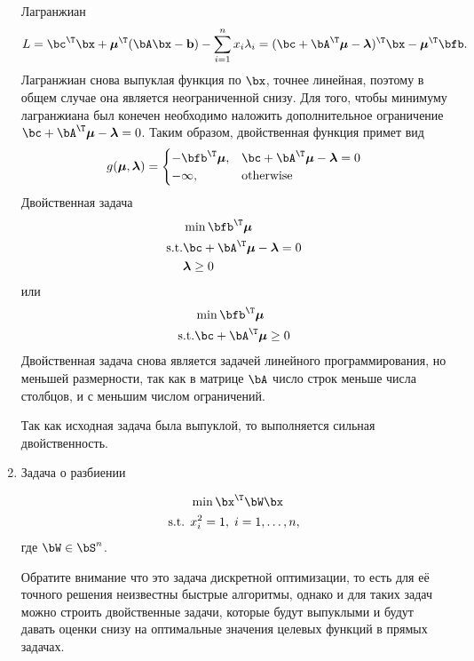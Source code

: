 \documentclass[12pt]{article}
\newcommand{\bmu}{\boldsymbol{\mu}}
\newcommand{\blambda}{\boldsymbol{\lambda}}
\begin{document}
\begin{enumerate}
Лагранжиан 
\[
L = \bc^{\T}\bx + \bmu^{\T}(\bA\bx - \mathbf{b}) - \sum_{i=1}^n x_i\lambda_i = (\bc + \bA^{\T}\bmu - \blambda)^{\T}\bx - \bmu^{\T}\bfb.
\]
Лагранжиан снова выпуклая функция по $\bx$, точнее линейная, поэтому в общем случае она является неограниченной снизу.
Для того, чтобы минимуму лагранжиана был конечен необходимо наложить дополнительное ограничение $\bc + \bA^{\T}\bmu - \blambda = 0$.
Таким образом, двойственная функция примет вид
\[
g(\bmu, \blambda) = 
\begin{cases}
-\bfb^{\T}\bmu, & \bc + \bA^{\T}\bmu - \blambda = 0 \\
-\infty, & \text{otherwise}
\end{cases}
\]
Двойственная задача
\begin{equation*}
\begin{split}
& \min \bfb^{\T}\bmu\\
\mathrm{s.t.} & \bc + \bA^{\T}\bmu - \blambda = 0 \\
& \blambda \geq 0
\end{split}
\end{equation*}
или
\begin{equation*}
\begin{split}
& \min \bfb^{\T}\bmu\\
\mathrm{s.t.} & \bc + \bA^{\T}\bmu \geq 0 \\
\end{split}
\end{equation*}
Двойственная задача снова является задачей линейного программирования, но меньшей размерности, так как в матрице $\bA$ число строк меньше числа столбцов, и с меньшим числом ограничений.

Так как исходная задача была выпуклой, то выполняется сильная двойственность. 

\item Задача о разбиении

\begin{equation*}
\begin{split}
& \min \bx^{\T}\bW\bx\\
\text{s.t. } & x^2_i = 1, \; i = 1,\ldots,n,
\end{split}
\end{equation*}
где $\bW \in \bS^n$.

Обратите внимание что это задача дискретной оптимизации, то есть для её точного решения неизвестны быстрые алгоритмы, однако и для таких задач можно строить двойственные  задачи, которые будут выпуклыми и будут давать оценки снизу на оптимальные значения целевых функций в прямых задачах.


\end{enumerate}
\end{document}
